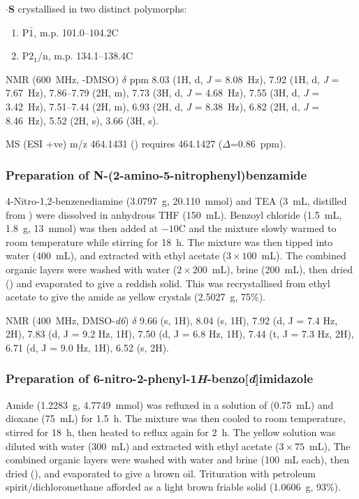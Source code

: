 \begin{refsection}
$\cdot$\textbf{S} crystallised in two distinct polymorphs:
\begin{enumerate}
    \item P$\bar{1}$, m.p. 101.0--104.2\degree C
    \item P$2_1$/n, m.p. 134.1--138.4\degree C
\end{enumerate}

 NMR (600~MHz, -DMSO) $\delta$ ppm 8.03 (1H, d, \emph{J} = 8.08~Hz), 7.92 (1H, d, \emph{J} = 7.67~Hz), 7.86--7.79 (2H, m), 7.73 (3H, d, \emph{J} = 4.68~Hz), 7.55 (3H, d, \emph{J} = 3.42~Hz), 7.51--7.44 (2H, m), 6.93 (2H, d, \emph{J} = 8.38~Hz), 6.82 (2H, d, \emph{J} = 8.46~Hz), 5.52 (2H, s), 3.66 (3H, s).

MS (ESI +ve) m/z 464.1431 ()  requires 464.1427 ($\Delta$=0.86~ppm).

\subsubsection[Preparation of \refcmpd{rhs-nitro-amide}]{Preparation of N-(2-amino-5-nitrophenyl)benzamide }
4-Nitro-1,2-benzenediamine (3.0797~g, 20.110~mmol) and TEA (3~mL, distilled from ) were dissolved in anhydrous THF (150~mL).
Benzoyl chloride (1.5~mL, 1.8~g, 13~mmol) was then added at $-10$\degree C and the mixture slowly warmed to room temperature while stirring for 18~h.
The mixture was then tipped into water (400~mL), and extracted with ethyl acetate ($3\times100$~mL).
The combined organic layers were washed with water ($2\times200$~mL), brine (200~mL), then dried () and evaporated to give a reddish solid.
This was recrystallised from ethyl acetate to give the amide  as yellow crystals (2.5027~g, 75\%).

 NMR (400~MHz, DMSO-\emph{d6}) $\delta$ 9.66 (s, 1H), 8.04 (s, 1H), 7.92 (d, J = 7.4 Hz, 2H), 7.83 (d, J = 9.2 Hz, 1H), 7.50 (d, J = 6.8 Hz, 1H), 7.44 (t, J = 7.3 Hz, 2H), 6.71 (d, J = 9.0 Hz, 1H), 6.52 (s, 2H).

\subsubsection[Preparation of \refcmpd{rhs-nitro}]{Preparation of 6-nitro-2-phenyl-1\emph{H}-benzo[\emph{d}]imidazole }
Amide  (1.2283~g, 4.7749~mmol) was refluxed in a solution of  (0.75~mL) and dioxane (75~mL) for 1.5~h.
The mixture was then cooled to room temperature, stirred for 18~h, then heated to reflux again for 2~h.
The yellow solution was diluted with water (300~mL) and extracted with ethyl acetate ($3\times75$~mL),
The combined organic layers were washed with water and brine (100~mL each), then dried (), and evaporated to give a brown oil.
Trituration with petroleum spirit/dichloromethane afforded  as a light brown friable solid (1.0606~g, 93\%).


\end{refsection}
